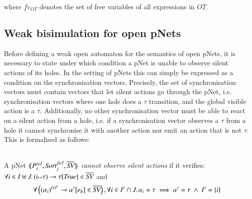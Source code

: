 \documentclass{elsarticle}
\begin{document}
where $fv_{OT}$ denotes the set of free variables of all expressions in $OT$.
\subsection{Weak bisimulation for open pNets}

Before defining a weak open automaton for the semantics of open pNets,
it is necessary to state under which condition a pNet is unable to
observe silent actions of its holes. In the setting of pNets this can
simply be expressed as a condition on the synchronisation
vectors. Precisely, the set of synchronisation vectors must contain
vectors that let silent actions go through the pNet,
i.e. synchronisation vectors where one hole does a $\tau$ transition,
and the global visible action is a $\tau$. Additionally, no other
synchronisation vector must be able to react on a silent action from a
hole, i.e. if a synchronisation vector observes a $\tau$ from a hole
it cannot synchronise it with another action nor emit an action that
is not $\tau$. This is formalised as follows:



\begin{definition}\label{def:non-obspNet}~\\
A pNet $\mylangle \pNet_i^{i\in I} , \Sort_j^{j\in J}, \set{\symb{SV}}\myrangle$
 \emph{cannot observe silent actions} if it verifies:\\ $\forall i\in I\uplus J.\, \SV{(i\mapsto \tau)}{\tau}{\True}\in \set{\symb{SV}}$ and 
\begin{equation*}
\forall \left(\SV{{(\alpha_i)}^{i\in I'}} 
{\alpha'} 
{e_b}\in \set{\symb{SV}}\right), %
\forall i\in I'\cap J.\, \alpha_i=\tau \implies %
\alpha'=\tau ~\land~ %
I'=\{i\}
\end{equation*}
\end{definition}
\end{document}
